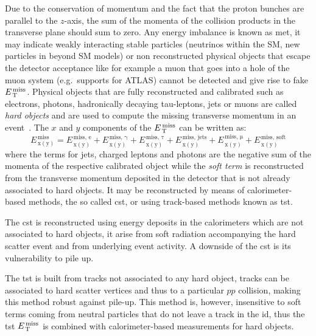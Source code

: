 Due to the conservation of momentum and the fact that the proton bunches are
parallel to the $z$-axis, the sum of the momenta of the collision products in
the transverse plane should sum to zero. Any energy imbalance is known as
\gls{met}, it may indicate weakly interacting stable particles (neutrinos within
the SM, new particles in beyond SM models) or non reconstructed physical objects
that escape the detector acceptance like for example a muon that goes into a
hole of the muon system (e.g.\ supports for ATLAS) cannot be detected and give
rise to fake $E_\mathrm{\, T}^\mathrm{\, miss}$.  Physical objects that are fully reconstructed and
calibrated such as electrons, photons, hadronically decaying tau-leptons, jets
or muons are called \emph{hard objects} and are used to compute the missing
transverse momentum in an event~\cite{MET}. The $x$ and $y$ components of the
$E_\mathrm{\, T}^\mathrm{\, miss}$ can be written as:
\begin{equation}
  \label{eq:94}
  E_\mathrm{\, x(y)}^\mathrm{\, miss} = E_\mathrm{\, x(y)}^\mathrm{\, miss,\, e} +
  E_\mathrm{\, x(y)}^\mathrm{\, miss,\, \gamma} + E_\mathrm{\, x(y)}^\mathrm{\,
    miss,\, \tau} + E_\mathrm{\, x(y)}^\mathrm{\, miss,\, \text{jets}} +
  E_\mathrm{\, x(y)}^\mathrm{\, miss,\, \mu} + E_\mathrm{\, x(y)}^\mathrm{\, miss,\,
    \text{soft}}
\end{equation}
where the terms for jets, charged leptons and photons are the negative sum of
the momenta of the respective calibrated object while the \emph{soft term} is
reconstructed from the transverse momentum deposited in the detector that is not
already associated to hard objects. It may be reconstructed by means of
calorimeter-based methods, the so called \gls{cst}, or using track-based methods
known as \gls{tst}.

The \gls{cst} is reconstructed using energy deposits in the calorimeters which
are not associated to hard objects, it arise from soft radiation accompanying
the hard scatter event and from underlying event activity. A downside of the
\gls{cst} is its vulnerability to pile up.

The \gls{tst} is built from tracks not associated to any hard object, tracks can
be associated to hard scatter vertices and thus to a particular $pp$ collision,
making this method robust against pile-up. This method is, however, insensitive
to soft terms coming from neutral particles that do not leave a track in the
\gls{id}, thus the \gls{tst} $E_\mathrm{\, T}^\mathrm{\, miss}$ is combined with calorimeter-based
measurements for hard objects.

